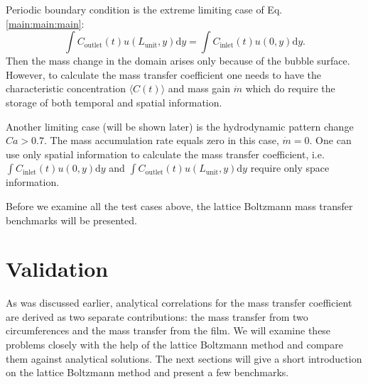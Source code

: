 \documentclass{article}
\newcommand{\beqstar}{\begin{equation*}}
\newcommand{\feqstar}{\end{equation*}}
\newcommand{\lunit}{L_{\mathrm{unit}}}
\newcommand{\cinlet}{C_{\mathrm{inlet}}}
\newcommand{\coutlet}{C_{\mathrm{outlet}}}
\begin{document}
Periodic boundary condition is the extreme
limiting case of Eq. \ref{main:main:main}: 
\beqstar
\int{\coutlet(t)
u(\lunit,y)\mathrm{d}y}=\int{\cinlet(t) u(0,y)\mathrm{d}y}. 
\feqstar
Then the mass change in the domain arises only because of the bubble
surface. However, to calculate the mass transfer coefficient one needs to have
the characteristic concentration  $\langle C(t) \rangle$ and mass gain $\dot{m}$
which do require the storage of both temporal and spatial information.

Another limiting case (will be shown later) is the hydrodynamic pattern change
$Ca>0.7$. The mass accumulation rate equals zero in this case, $\dot{m}=0$. One
can use only spatial information to calculate the mass transfer coefficient,
i.e. $\int{\cinlet(t) u(0,y) \mathrm{d}y}$ and $\int{\coutlet(t)
u(\lunit,y)\mathrm{d}y}$ require only space information. 

Before we examine all the test cases above, the lattice Boltzmann mass transfer
benchmarks will be presented. 

\section{Validation}
As was discussed earlier, analytical correlations for the mass transfer coefficient
are derived  as two separate contributions: the mass transfer from two
circumferences and the mass transfer from the film. We will examine these
problems closely with the help of the lattice Boltzmann method and compare them
against analytical
solutions. The next sections will give a short introduction on the lattice Boltzmann method and present a few benchmarks.
\end{document}
